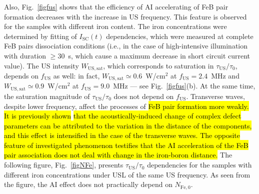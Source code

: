 \documentclass[sn-mathphys]{sn-jnl}%
\theoremstyle{thmstyleone}%
\theoremstyle{thmstyletwo}%
\theoremstyle{thmstylethree}%
\begin{document}


Also, Fig.~\ref{figfus} shows that the efficiency of AI accelerating of FeB pair formation
decreases with the increase in US frequency.
This feature is observed for the samples with different iron content.
The iron concentrations were determined by fitting of $I_\mathrm{SC}(t)$ dependencies,
which were measured at complete FeB pairs dissociation conditions
(i.e., in the case of high-intensive illumination with duration $\geq 30$~s,
which cause a maximum decrease in short circuit current value).
The US intensity $W_\mathrm{US,sat}$, which corresponds to saturation in
$\tau_\mathrm{US}/\tau_{0}$, depends on $f_\mathrm{US}$ as well:
in fact, $W_\mathrm{US,sat}\simeq0.6$~W/cm$^2$ at $f_\mathrm{US}=2.4$~MHz
and $W_\mathrm{US,sat}\simeq0.9$~W/cm$^2$ at $f_\mathrm{US}=9.0$~MHz --- see Fig.~\ref{figfus}(b).
At the same time, the saturation magnitude of $\tau_\mathrm{US}/\tau_{0}$ does not depend on $f_\mathrm{US}$.
Transverse waves, despite lower frequency, affect the processes of \hl{FeB pair formation more weakly.
It is previously shown} \cite{Olikh2018SM} \hl{that the acoustically-induced change of complex defect parameters can be attributed to the variation in the distance of the components, and this effect is intensified in the case of the transverse waves.
The opposite feature of investigated phenomenon testifies that the AI acceleration of the FeB pair
association does not deal with change in the iron-boron distance.}
The following figure, Fig.~\ref{figNFe}, presents $\tau_\mathrm{US}/\tau_{0}$  dependencies
for the samples with different iron concentrations under USL of the same US frequency.
As seen from the figure, the AI effect does not practically depend on $N_\mathrm{Fe,0}$.
\end{document}
